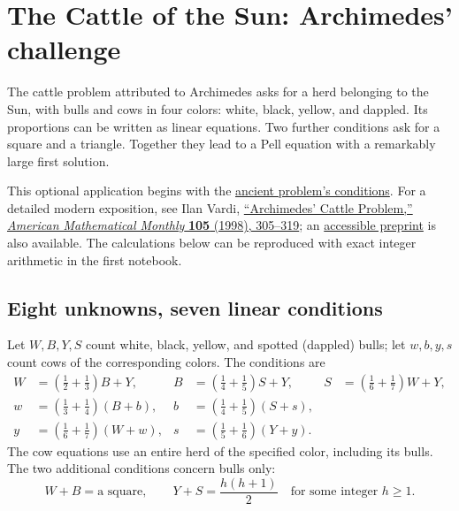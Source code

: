 \section{The Cattle of the Sun: Archimedes' challenge}
\label{sec:archimedes-cattle}

The cattle problem attributed to Archimedes asks for a herd belonging to
the Sun, with bulls and cows in four colors: white, black, yellow, and
dappled. Its proportions can be written as linear equations. Two further
conditions ask for a square and a triangle. Together they lead to a Pell
equation with a remarkably large first solution.

This optional application begins with the
\href{https://math.nyu.edu/Archimedes/Cattle/Statement.html}{ancient problem's conditions}.
For a detailed modern exposition, see Ilan Vardi,
\href{https://doi.org/10.1080/00029890.1998.12004887}{``Archimedes' Cattle Problem,''
\emph{American Mathematical Monthly} \textbf{105} (1998), 305--319};
an \href{https://www.maths.tcd.ie/~lebed/Cattle\%20problem\%20Ilan\%20Vardi.pdf}{accessible preprint}
is also available. The calculations below can be reproduced with exact
integer arithmetic in the first notebook.

\subsection*{Eight unknowns, seven linear conditions}
Let $W,B,Y,S$ count white, black, yellow, and spotted (dappled) bulls;
let $w,b,y,s$ count cows of the corresponding colors. The conditions are
\begin{align*}
 W&=\left(\frac12+\frac13\right)B+Y,
 &B&=\left(\frac14+\frac15\right)S+Y,
 &S&=\left(\frac16+\frac17\right)W+Y,\\
 w&=\left(\frac13+\frac14\right)(B+b),
 &b&=\left(\frac14+\frac15\right)(S+s),\\
 y&=\left(\frac16+\frac17\right)(W+w),
 &s&=\left(\frac15+\frac16\right)(Y+y).
\end{align*}
The cow equations use an entire herd of the specified color, including
its bulls. The two additional conditions concern bulls only:
\begin{equation}\label{eq:cattle-shapes}
 W+B=\text{a square},\qquad
 Y+S=\frac{h(h+1)}2\quad\text{for some integer }h\ge1.
\end{equation}

